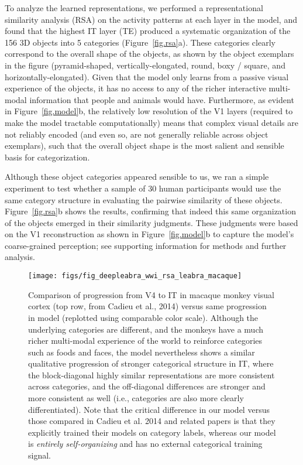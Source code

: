 \documentclass[11pt,twoside]{article}
\newif\myifpdf
\begin{document}
To analyze the learned representations, we performed a representational similarity analysis (RSA) on the activity patterns at each layer in the model, and found that the highest IT layer (TE) produced a systematic organization of the 156 3D objects into 5 categories (Figure~\ref{fig.rsa}a).  These categories clearly correspond to the overall shape of the objects, as shown by the object exemplars in the figure (pyramid-shaped, vertically-elongated, round, boxy / square, and horizontally-elongated).  Given that the model only learns from a passive visual experience of the objects, it has no access to any of the richer interactive multi-modal information that people and animals would have.  Furthermore, as evident in Figure~\ref{fig.model}b, the relatively low resolution of the V1 layers (required to make the model tractable computationally) means that complex visual details are not reliably encoded (and even so, are not generally reliable across object exemplars), such that the overall object shape is the most salient and sensible basis for categorization.

Although these object categories appeared sensible to us, we ran a simple experiment to test whether a sample of 30 human participants would use the same category structure in evaluating the pairwise similarity of these objects.  Figure~\ref{fig.rsa}b shows the results, confirming that indeed this same organization of the objects emerged in their similarity judgments.  These judgments were based on the V1 reconstruction as shown in Figure~\ref{fig.model}b to capture the model's coarse-grained perception; see supporting information for methods and further analysis.

\begin{figure}
  \centering\texttt{[image: figs/fig\_deepleabra\_wwi\_rsa\_leabra\_macaque]}
  \caption{Comparison of progression from V4 to IT in macaque monkey visual cortex (top row, from Cadieu et al., 2014) versus same progression in model (replotted using comparable color scale).  Although the underlying categories are different, and the monkeys have a much richer multi-modal experience of the world to reinforce categories such as foods and faces, the model nevertheless shows a similar qualitative progression of stronger categorical structure in IT, where the block-diagonal highly similar representations are more consistent across categories, and the off-diagonal differences are stronger and more consistent as well (i.e., categories are also more clearly differentiated).  Note that the critical difference in our model versus those compared in Cadieu et al. 2014 and related papers is that they explicitly trained their models on category labels, whereas our model is \emph{entirely self-organizing} and has no external categorical training signal.}
  \label{fig.macaque}
\end{figure}
\end{document}
